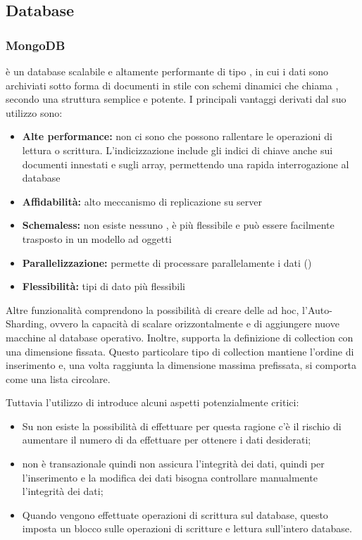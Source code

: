 \documentclass[12pt,a4paper]{article}
\begin{document}
\subsection{Database}
\subsubsection{MongoDB}\label{mongodb}
 è un database   scalabile e altamente performante di tipo , in cui i dati sono archiviati sotto forma di documenti in stile  con schemi dinamici che  chiama , secondo una struttura semplice e potente. I principali vantaggi derivati dal suo utilizzo sono:

\begin{itemize}
	\item \textbf{Alte performance:} non ci sono  che possono rallentare le operazioni di lettura o scrittura. L’indicizzazione include gli indici di chiave anche sui documenti innestati e sugli array, permettendo una rapida interrogazione al database
	\item \textbf{Affidabilità:} alto meccanismo di replicazione su server
	\item \textbf{Schemaless:} non esiste nessuno , è più flessibile e può essere facilmente trasposto in un modello ad oggetti
	\item \textbf{Parallelizzazione:} permette di processare parallelamente i dati ()
	\item \textbf{Flessibilità:} tipi di dato più flessibili
\end{itemize}

Altre funzionalità comprendono la possibilità di creare delle  ad hoc, l’Auto-Sharding, ovvero la capacità di scalare orizzontalmente e di aggiungere nuove macchine al database operativo. Inoltre,  supporta la definizione di collection con una dimensione fissata. Questo particolare tipo di collection mantiene l’ordine di inserimento e, una volta raggiunta la dimensione massima prefissata, si comporta come una lista circolare.

Tuttavia l'utilizzo di  introduce alcuni aspetti potenzialmente critici:
\begin{itemize}
	\item Su  non esiste la possibilità di effettuare  per questa ragione c'è il rischio di aumentare il numero di  da effettuare per ottenere i dati desiderati;
	\item {} non è transazionale quindi non assicura l'integrità dei dati, quindi per l'inserimento e la modifica dei dati bisogna controllare manualmente l'integrità dei dati;
	\item Quando vengono effettuate operazioni di scrittura sul database, questo imposta un blocco sulle operazioni di scritture e lettura sull'intero database. 
\end{itemize}
\end{document}
